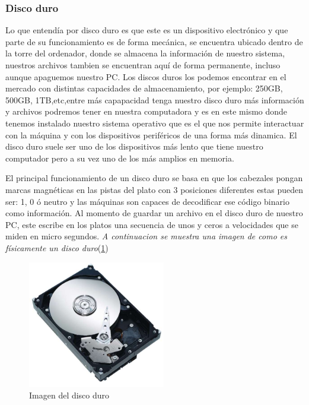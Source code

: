 \documentclass{article}
\begin{document}
\subsubsection{Disco duro}
\noindent
Lo que entendía por disco duro es que este es un dispositivo electrónico y que parte de su funcionamiento es de forma mecánica, se encuentra ubicado dentro de la torre del ordenador, donde se almacena la información de nuestro sistema, nuestros archivos tambien se encuentran aquí de forma permanente, incluso aunque apaguemos nuestro PC.
Los discos duros los podemos encontrar en el mercado con distintas capacidades de almacenamiento, por ejemplo: 250GB, 500GB, 1TB,etc,entre más capapacidad tenga nuestro disco duro más información y archivos podremos tener en nuestra computadora y es en este mismo donde tenemos instalado nuestro sistema operativo que es el que nos permite interactuar con la máquina y con los dispositivos periféricos de una forma más dinamica. El disco duro suele ser uno de los dispositivos más lento que tiene nuestro computador pero a su vez uno de los más amplios en memoria. 

\vspace{0.2cm}
\noindent
El principal funcionamiento de un disco duro se basa en que los cabezales pongan marcas magnéticas en las pistas del plato con 3 posiciones diferentes estas pueden ser: 1, 0 ó neutro y las máquinas son capaces de decodificar ese código binario como información. Al momento de guardar un archivo en el disco duro de nuestro PC, este escribe en los platos una secuencia de unos y ceros a velocidades que se miden en micro segundos. \cite{qloudea}
\vspace{0.2cm}
\noindent
\emph{A continuacion se muestra una imagen de como es físicamente un disco duro}(\ref{fig:disco_duro})

\begin{figure}[h]
\includegraphics[width=6cm]{disco_duro.jpg}
\centering
\caption{Imagen del disco duro}
\label{fig:disco_duro}
\end{figure}
\end{document}
